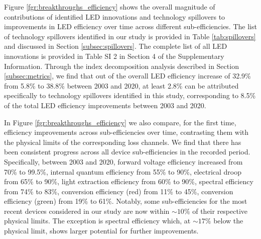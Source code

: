 \documentclass[journal=jacsat,manuscript=article]{achemso}
\begin{document}
Figure \ref{fgr:breakthroughs_efficiency} shows the overall magnitude of contributions of identified LED innovations and technology spillovers to improvements in LED efficiency over time across different sub-efficiencies. The list of technology spillovers identified in our study is provided in Table \ref{tab:spillovers} and discussed in Section \ref{subsec:spillovers}. The complete list of all LED innovations is provided in Table SI 2 in Section 4 of the Supplementary Information. Through the index decomposition analysis described in Section \ref{subsec:metrics}, we find that out of the overall LED efficiency increase of 32.9\% from 5.8\% to 38.8\% between 2003 and 2020, at least 2.8\% can be attributed specifically to technology spillovers identified in this study, corresponding to 8.5\% of the total LED efficiency improvements between 2003 and 2020.

In Figure \ref{fgr:breakthroughs_efficiency} we also compare, for the first time, efficiency improvements across sub-efficiencies over time, contrasting them with the physical limits of the corresponding loss channels. We find that there has been consistent progress across all device sub-efficiencies in the recorded period. Specifically, between 2003 and 2020, forward voltage efficiency increased from 70\% to 99.5\%, internal quantum efficiency from 55\% to 90\%, electrical droop from 65\% to 90\%, light extraction efficiency from 60\% to 90\%, spectral efficiency from 74\% to 83\%, conversion efficiency (red) from 11\% to 45\%, conversion efficiency (green) from 19\% to 61\%. Notably, some sub-efficiencies for the most recent devices considered in our study are now within $\sim10\%$ of their respective physical limits. The exception is spectral efficiency which, at $\sim17\%$ below the physical limit, shows larger potential for further improvements.
\end{document}
